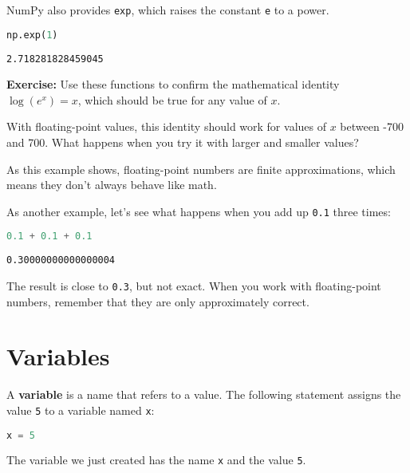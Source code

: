 NumPy also provides \passthrough{\lstinline!exp!}, which raises the
constant \passthrough{\lstinline!e!} to a power.

\begin{lstlisting}[language=Python,style=source]
np.exp(1)
\end{lstlisting}

\begin{lstlisting}[style=output]
2.718281828459045
\end{lstlisting}

\textbf{Exercise:} Use these functions to confirm the mathematical
identity \(\log(e^x) = x\), which should be true for any value of \(x\).

With floating-point values, this identity should work for values of
\(x\) between -700 and 700. What happens when you try it with larger and
smaller values?

As this example shows, floating-point numbers are finite approximations,
which means they don't always behave like math.

As another example, let's see what happens when you add up
\passthrough{\lstinline!0.1!} three times:

\begin{lstlisting}[language=Python,style=source]
0.1 + 0.1 + 0.1
\end{lstlisting}

\begin{lstlisting}[style=output]
0.30000000000000004
\end{lstlisting}

The result is close to \passthrough{\lstinline!0.3!}, but not exact.
When you work with floating-point numbers, remember that they are only
approximately correct.

\hypertarget{variables}{%
\section{Variables}\label{variables}}

A \textbf{variable} is a name that refers to a value. The following
statement assigns the value \passthrough{\lstinline!5!} to a variable
named \passthrough{\lstinline!x!}:

\begin{lstlisting}[language=Python,style=source]
x = 5
\end{lstlisting}

The variable we just created has the name \passthrough{\lstinline!x!}
and the value \passthrough{\lstinline!5!}.

